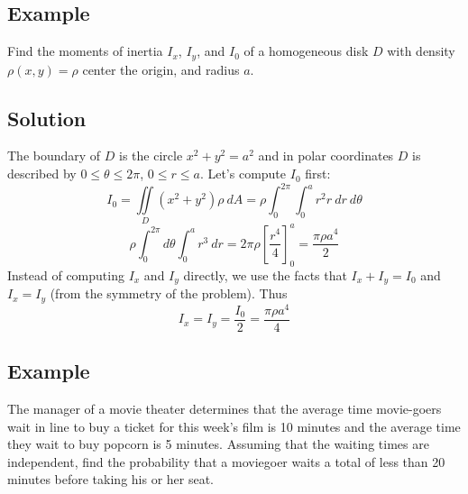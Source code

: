 \subsection*{Example}
Find the moments of inertia $I_x$, $I_y$, and $I_0$ of a homogeneous disk $D$ with density
$\rho(x,y)=\rho$ center the origin, and radius $a$.

\subsection*{Solution}
The boundary of $D$ is the circle $x^2+y^2=a^2$ and in polar coordinates $D$ is
described by $0\leq\theta\leq 2\pi$, $0\leq r\leq a$. Let's compute $I_0$ first:
$$I_0=\iint\limits_D(x^2+y^2)\rho\:dA=\rho\int_0^{2\pi}\int_0^{a}r^2r\:dr\:d\theta$$
$$\rho\int_0^{2\pi}d\theta\int_0^ar^3\:dr=2\pi\rho\left[\frac{r^4}{4}\right]_0^a=\frac{\pi\rho a^4}{2}$$
Instead of computing $I_x$ and $I_y$ directly, we use the facts that $I_x+I_y=I_0$ and
$I_x=I_y$ (from the symmetry of the problem). Thus
$$I_x=I_y=\frac{I_0}{2}=\frac{\pi\rho a^4}{4}$$

\subsection*{Example}
The manager of a movie theater determines that the average time movie-goers
wait in line to buy a ticket for this week’s film is 10 minutes and the average
time they wait to buy popcorn is 5 minutes. Assuming that the waiting times are
independent, find the probability that a moviegoer waits a total of less than 20
minutes before taking his or her seat.


